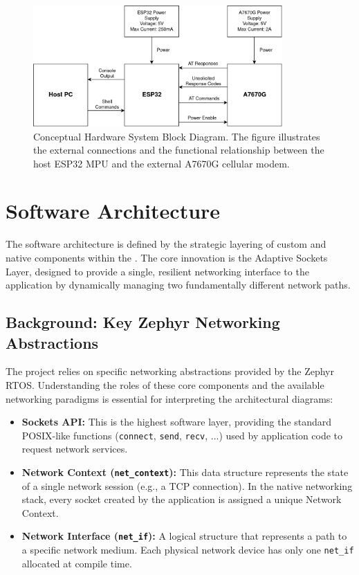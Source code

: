 \begin{figure}[H]
    \centering
    \includegraphics[width=0.85\textwidth]{"images/hardware-architecture.png"}
    \caption{Conceptual Hardware System Block Diagram. The figure illustrates the external connections and the functional relationship between the host ESP32 MPU and the external A7670G cellular modem.}
    \label{fig:hardware-arch-diagram}
\end{figure}

\section{Software Architecture}
\label{sec:software_architecture}

The software architecture is defined by the strategic layering of custom and native components within the . The core innovation is the Adaptive Sockets Layer, designed to provide a single, resilient networking interface to the application by dynamically managing two fundamentally different network paths.

\subsection{Background: Key Zephyr Networking Abstractions}
\label{ssec:background_zephyr}

The project relies on specific networking abstractions provided by the Zephyr RTOS. Understanding the roles of these core components and the available networking paradigms is essential for interpreting the architectural diagrams:

\begin{itemize}
    \item \textbf{Sockets API:} This is the highest software layer, providing the standard POSIX-like functions (\texttt{connect}, \texttt{send}, \texttt{recv}, ...) used by application code to request network services.
    \item \textbf{Network Context (\texttt{net\_context}):} This data structure represents the state of a single network session (e.g., a TCP connection). In the native networking stack, every socket created by the application is assigned a unique Network Context.
    \item \textbf{Network Interface (\texttt{net\_if}):} A logical structure that represents a path to a specific network medium. Each physical network device has only one \texttt{net\_if} allocated at compile time.
\end{itemize}

